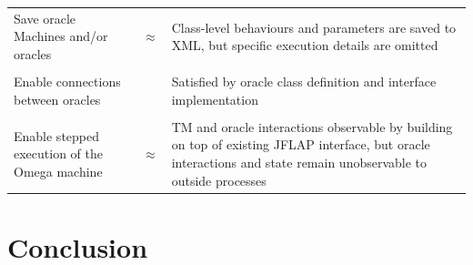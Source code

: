 \documentclass[12pt]{article}
\newcommand{\cmark}{\ding{51}}
\begin{document}
\begin{table}[h!]
\begin{tabular}{m{2in} m{0.5in} m{3in}}
				Save oracle Machines and/or oracles & \begin{center}\textcolor{Peach}{{\Large $ \approx $}}\end{center} & Class-level behaviours and parameters are saved to XML, but specific execution details are omitted \\\\
				Enable connections between oracles & \begin{center}\textcolor{ForestGreen}{{\Large \cmark}}\end{center} & Satisfied by oracle class definition and interface implementation \\\\
				Enable stepped execution of the Omega machine& \begin{center}\textcolor{Peach}{{\Large $ \approx $}}\end{center} & TM and oracle interactions observable by building on top of existing JFLAP interface, but oracle interactions and state remain unobservable to outside processes 
			\end{tabular}
		\end{table}

	\clearpage\section{Conclusion}\label{sec6}
\end{document}
